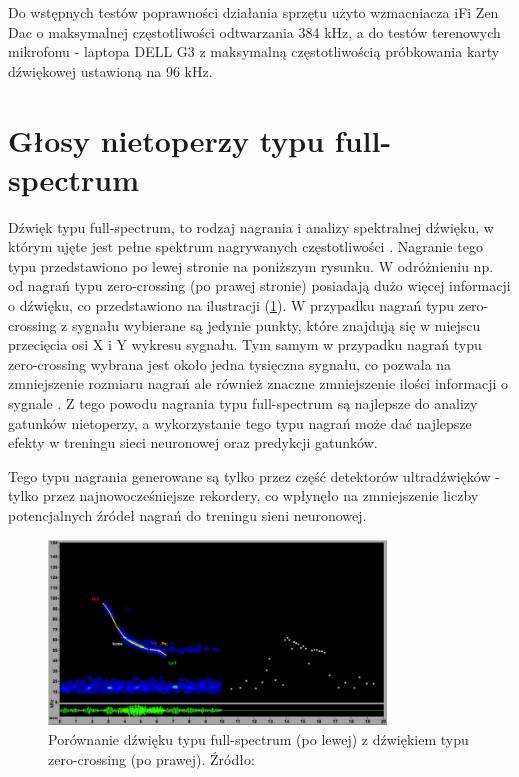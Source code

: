 \documentclass{sprz}
\begin{document}
Do wstępnych testów poprawności działania sprzętu użyto wzmacniacza iFi Zen Dac o maksymalnej częstotliwości odtwarzania 384 kHz, a do testów terenowych mikrofonu - laptopa DELL G3 z maksymalną częstotliwością próbkowania karty dźwiękowej ustawioną na 96 kHz.

\section{Głosy nietoperzy typu full-spectrum}
Dźwięk typu full-spectrum, to rodzaj nagrania i analizy spektralnej dźwięku, w którym ujęte jest pełne spektrum nagrywanych częstotliwości \cite{fullspectrum}. Nagranie tego typu przedstawiono po lewej stronie na poniższym rysunku. W odróżnieniu np. od nagrań typu zero-crossing (po prawej stronie) posiadają dużo więcej informacji o dźwięku, co przedstawiono na ilustracji (\ref{img:fullspectrum}). W przypadku nagrań typu zero-crossing z sygnału wybierane są jedynie punkty, które znajdują się w miejscu przecięcia osi X i Y wykresu sygnału. Tym samym w przypadku nagrań typu zero-crossing wybrana jest około jedna tysięczna sygnału, co pozwala na zmniejszenie rozmiaru nagrań ale również znaczne zmniejszenie ilości informacji o sygnale \cite{fullspectrum}. Z tego powodu nagrania typu full-spectrum są najlepsze do analizy gatunków nietoperzy, a wykorzystanie tego typu nagrań może dać najlepsze efekty w treningu sieci neuronowej oraz predykcji gatunków.

Tego typu nagrania generowane są tylko przez część detektorów ultradźwięków - tylko przez najnowocześniejsze rekordery, co wpłynęło na zmniejszenie liczby potencjalnych źródeł nagrań do treningu sieni neuronowej.

\begin{figure}[h]
  \centering
  \includegraphics[width=0.8\textwidth]{sprz/fullspectrum.png}
  \caption{Porównanie dźwięku typu full-spectrum (po lewej) z dźwiękiem typu zero-crossing (po prawej). Źródło: \cite{fullspectrum}}
  \label{img:fullspectrum}
\end{figure} 
\end{document}
